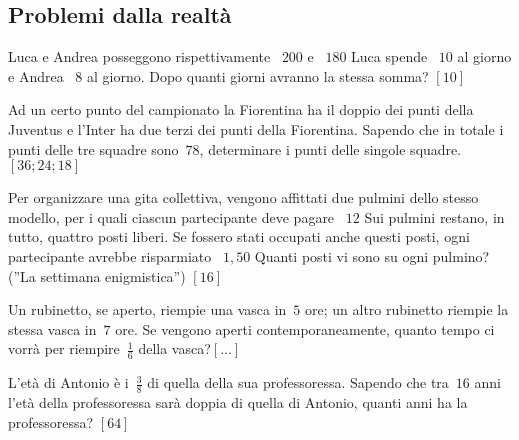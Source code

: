 \subsection{Problemi dalla realtà}

\begin{multicols}{2}
\begin{esercizio}[\Ast]
\label{ese:14.39}
Luca e Andrea posseggono rispettivamente \officialeuro~\(200\) e 
\officialeuro~\(180\) Luca spende \officialeuro~\(10\) al giorno e Andrea 
\officialeuro~\(8\) al giorno. Dopo quanti giorni avranno la stessa somma? 
\hfill \(\left[10\right]\)
\end{esercizio}

\begin{esercizio}[\Ast]
\label{ese:14.40}
Ad un certo punto del campionato la Fiorentina ha il doppio dei punti della 
Juventus e l'Inter ha due terzi dei punti della Fiorentina. Sapendo che in 
totale i punti delle tre squadre sono~\(78\), determinare i punti delle singole 
squadre. \hfill \(\left[36; 24; 18\right]\)
\end{esercizio}

\begin{esercizio}[\Ast]
\label{ese:14.41}
Per organizzare una gita collettiva, vengono affittati due pulmini dello stesso 
modello, per i quali ciascun partecipante deve pagare \officialeuro~\(12\) Sui 
pulmini restano, in tutto, quattro posti liberi. Se fossero stati occupati 
anche 
questi posti, ogni partecipante avrebbe risparmiato \officialeuro~\(1,50\) Quanti 
posti vi sono su ogni pulmino? (''La settimana enigmistica'') 
\hfill \(\left[16\right]\)
\end{esercizio}

\begin{esercizio}
\label{ese:14.42}
Un rubinetto, se aperto, riempie una vasca in~\(5\) ore; un altro rubinetto 
riempie la stessa vasca in~\(7\) ore. Se vengono aperti contemporaneamente, 
quanto 
tempo ci vorrà per riempire~\(\frac{1}{6}\) della vasca?\hfill \(\left[...\right]\)
\end{esercizio}

\begin{esercizio}[\Ast]
\label{ese:14.43}
L'età di Antonio è i~\(\frac{3}{8}\) di quella della sua professoressa. Sapendo 
che tra~\(16\) anni l'età della professoressa sarà doppia di quella di Antonio, 
quanti anni ha la professoressa? \hfill \(\left[64\right]\)
\end{esercizio}


\end{multicols}
